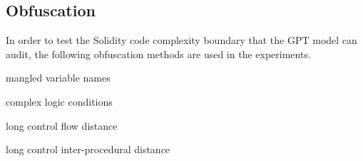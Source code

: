 \subsection{Obfuscation}
In order to test the Solidity code complexity boundary that the GPT model can audit, the following obfuscation methods are used in the experiments.

{\color{red} mangled variable names }

{\color{red} complex logic conditions }

{\color{red} long control flow distance }

{\color{red} long control inter-procedural distance }





